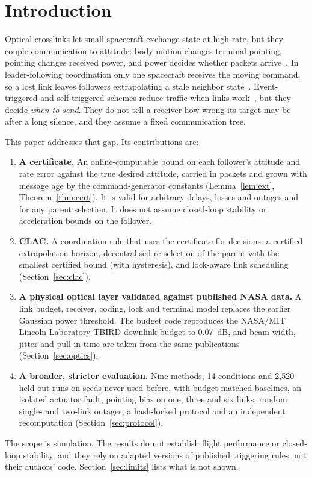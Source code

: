 \documentclass[journal]{IEEEtran}
\begin{document}
\section{Introduction}
Optical crosslinks let small spacecraft exchange state at high rate, but they couple communication to attitude: body motion changes terminal pointing, pointing changes received power, and power decides whether packets arrive~\cite{click}. In leader-following coordination only one spacecraft receives the moving command, so a lost link leaves followers extrapolating a stale neighbor state~\cite{cai2014,dimarogonas2009}. Event-triggered and self-triggered schemes reduce traffic when links work~\cite{tabuada2007,heemels2012,girard2015,xie2023,xie2024taes,wang2021,jia2023}, but they decide \emph{when to send}. They do not tell a receiver how wrong its target may be after a long silence, and they assume a fixed communication tree.

This paper addresses that gap. Its contributions are:
\begin{enumerate}
\item \textbf{A certificate.} An online-computable bound on each follower's attitude and rate error against the true desired attitude, carried in packets and grown with message age by the command-generator constants (Lemma~\ref{lem:ext}, Theorem~\ref{thm:cert}). It is valid for arbitrary delays, losses and outages and for any parent selection. It does not assume closed-loop stability or acceleration bounds on the follower.
\item \textbf{CLAC.} A coordination rule that uses the certificate for decisions: a certified extrapolation horizon, decentralised re-selection of the parent with the smallest certified bound (with hysteresis), and lock-aware link scheduling (Section~\ref{sec:clac}).
\item \textbf{A physical optical layer validated against published NASA data.} A link budget, receiver, coding, lock and terminal model replaces the earlier Gaussian power threshold. The budget code reproduces the NASA/MIT Lincoln Laboratory TBIRD downlink budget to 0.07~dB, and beam width, jitter and pull-in time are taken from the same publications (Section~\ref{sec:optics}).
\item \textbf{A broader, stricter evaluation.} Nine methods, 14 conditions and 2{,}520 held-out runs on seeds never used before, with budget-matched baselines, an isolated actuator fault, pointing bias on one, three and six links, random single- and two-link outages, a hash-locked protocol and an independent recomputation (Section~\ref{sec:protocol}).
\end{enumerate}
The scope is simulation. The results do not establish flight performance or closed-loop stability, and they rely on adapted versions of published triggering rules, not their authors' code. Section~\ref{sec:limits} lists what is not shown.
\end{document}
